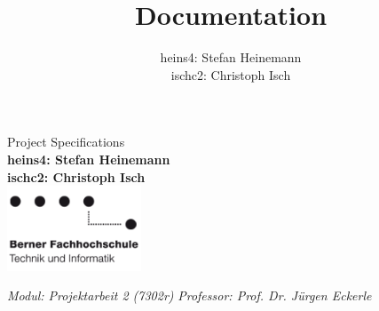 \documentclass[a4paper,10pt,titlepage]{article}
\title{Documentation}
\author{heins4: Stefan Heinemann\\ischc2: Christoph Isch}
\begin{document}
\begin{titlepage}
{\huge Project Specifications}\\
\textbf{heins4: Stefan Heinemann}\\
\textbf{ischc2: Christoph Isch}\\
\newline\newline\newline\newline\newline
\newline\newline\newline\newline\newline\newline\newline\newline\newline
\newline\newline\newline\newline\newline\newline\newline\newline
\includegraphics[width=40mm]{bfh_logo.png}\newline

\emph{Modul: Projektarbeit 2 (7302r)}\newline
\emph{Professor: Prof. Dr. Jürgen Eckerle}

\end{titlepage}
\end{document}
